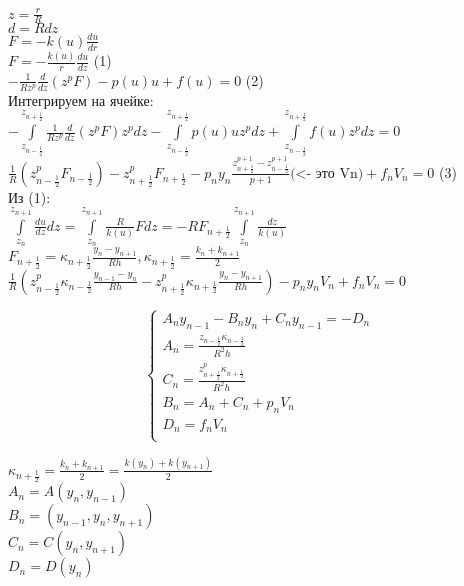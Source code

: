 $z = \frac{r}{R}$\\
$d = Rdz$\\
$F = -k(u)\frac{du}{dr}$\\
$F = -\frac{k(u)}{r} \frac{du}{dz}$ (1)\\
$-\frac{1}{R z^{p}} \frac{d}{dz} (z^{p} F)  - p(u)u + f(u) = 0$ (2)\\
Интегрируем на ячейке:\\
$-\int\limits_{z_{n-\frac{1}{2}}}^{z_{n+\frac{1}{2}}}\frac{1}{Rz^{p}}\frac{d}{dz}(z^{p}F)z^{p}dz  - \int\limits_{z_{n-\frac{1}{2}}}^{z_{n+\frac{1}{2}}}p(u)u z^{p} dz + \int\limits_{z_{n-\frac{1}{2}}}^{z_{n+\frac{1}{2}}} f(u) z^{p} dz = 0$\\

$\frac{1}{R} (z^p_{n-\frac{1}{2}} F_{n-\frac{1}{2}}) - z^p_{n+\frac{1}{2}} F_{n+\frac{1}{2}} - p_n y_n \frac{z^{p+1}_{n+\frac{1}{2}} - z^{p+1}_{n-\frac{1}{2}}}{p + 1} \text{(<- это Vn)} + f_n V_n = 0$  (3)\\

Из (1):\\
$\int\limits_{z_n}^{z_{n+1}} \frac{du}{dz}dz = \int\limits_{z_n}^{z_{n+1}}\frac{R}{k(u)}F dz = -R F_{n+\frac{1}{2}} \int\limits_{z_n}^{z_{n+1}}\frac{dz}{k(u)}$\\
$F_{n+\frac{1}{2}} = \kappa_{n+\frac{1}{2}}\frac{y_n  - y_{n+1}}{R h}, \kappa_{n+\frac{1}{2}} = \frac{k_{n} + k_{n+1}}{2}$\\

$\frac{1}{R}(z^p_{n-\frac{1}{2}} \kappa_{n-\frac{1}{2}} \frac{y_{n-1} - y_n}{Rh} - z^p_{n+\frac{1}{2}} \kappa_{n+\frac{1}{2}} \frac{y_n - y_{n+1}}{Rh}) - p_n y_n V_n + f_n V_n = 0$ 

\begin{equation}
\begin{cases}
A_n y_{n-1} - B_n y_n+ C_n y_{n-1} = - D_n\\
A_n = \frac{z_{n-\frac{1}{2}} \kappa_{n-\frac{1}{2}}}{R^2 h}\\
C_n = \frac{z_{n+\frac{1}{2}}^p \kappa_{n+\frac{1}{2}}}{R^2 h}\\
B_n = A_n + C_n + p_n V_n\\
D_n = f_n V_n\\
\end{cases}
\end{equation}

$\kappa_{n+\frac{1}{2}} = \frac{k_n + k_{n+1}}{2} = \frac{k(y_n) + k(y_{n+1})}{2}$\\
$A_n = A(y_n, y_{n-1})$\\
$B_n = (y_{n-1}, y_n, y_{n+1})$\\
$C_n = C(y_n, y_{n+1})$\\
$D_n = D(y_n)$\\

